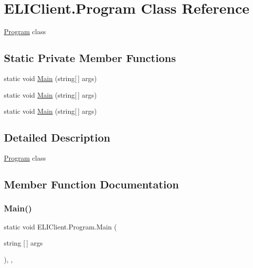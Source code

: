 \hypertarget{class_e_l_i_client_1_1_program}{}\section{E\+L\+I\+Client.\+Program Class Reference}
\label{class_e_l_i_client_1_1_program}


\hyperlink{class_e_l_i_client_1_1_program}{Program} class  


\subsection*{Static Private Member Functions}
\begin{DoxyCompactItemize}
\item 
static void \hyperlink{class_e_l_i_client_1_1_program_a068c4621644e04f378693e706c77c2dd}{Main} (string\mbox{[}$\,$\mbox{]} args)
\item 
static void \hyperlink{class_e_l_i_client_1_1_program_a068c4621644e04f378693e706c77c2dd}{Main} (string\mbox{[}$\,$\mbox{]} args)
\item 
static void \hyperlink{class_e_l_i_client_1_1_program_a068c4621644e04f378693e706c77c2dd}{Main} (string\mbox{[}$\,$\mbox{]} args)
\end{DoxyCompactItemize}


\subsection{Detailed Description}
\hyperlink{class_e_l_i_client_1_1_program}{Program} class 



\subsection{Member Function Documentation}
\mbox{\label{class_e_l_i_client_1_1_program_a068c4621644e04f378693e706c77c2dd}} 
\subsubsection{\texorpdfstring{Main()}{Main()}\hspace{0.1cm}{\footnotesize\ttfamily [1/3]}}
{\footnotesize\ttfamily static void E\+L\+I\+Client.\+Program.\+Main (\begin{DoxyParamCaption}\item[{string \mbox{[}$\,$\mbox{]}}]{args }\end{DoxyParamCaption})\hspace{0.3cm}{\ttfamily [inline]}, {\ttfamily [static]}, {\ttfamily [private]}}

